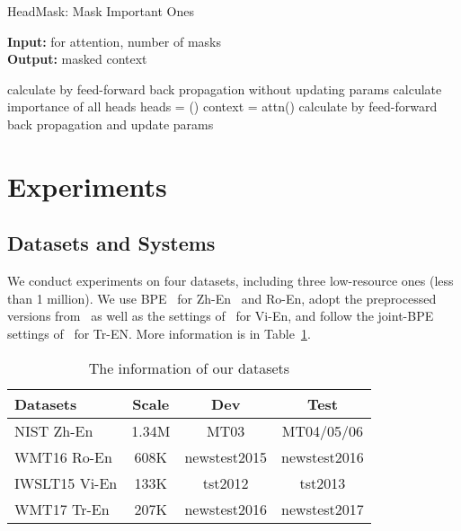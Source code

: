 \documentclass[11pt]{article}
\begin{document}
\begin{algorithm}[h]\footnotesize
    \caption{HeadMask: Mask Important Ones}
    \label{alg_importance}
    \begin{flushleft}
        \hspace*{0.02in} {\bf Input:}  for attention, number of masks \\
        \hspace*{0.02in} {\bf Output:} masked context
    \end{flushleft}
    \begin{algorithmic}[1]
            \STATE calculate  by feed-forward
            \STATE back propagation without updating params
            \STATE calculate importance of all heads 
            \STATE heads = ()
                \STATE 
            \ENDFOR
            \STATE context = attn()
            \STATE calculate  by feed-forward
            \STATE back propagation and update params
        \ENDFOR
  \end{algorithmic}
\end{algorithm}



\section{Experiments}

\subsection{Datasets and Systems}

We conduct experiments on four datasets, including three low-resource ones (less than 1 million). We use BPE~\cite{sennrich2016bpe} for Zh-En~\cite{Zheng2018LearningTD} and Ro-En, adopt the preprocessed versions from~ as well as the settings of~ for Vi-En, and follow the joint-BPE settings of~ for Tr-EN.
More information is in Table~\ref{tab_dataset}.





\begin{table}[h]\footnotesize
    \centering
    \begin{tabular}{lccc}
        \hline
        Datasets & Scale & Dev & Test \\ \hline
        NIST Zh-En & 1.34M & MT03 & MT04/05/06 \\ \hline
        WMT16 Ro-En & 608K & newstest2015 & newstest2016  \\ \hline
        IWSLT15 Vi-En & 133K & tst2012 & tst2013 \\ \hline
        WMT17 Tr-En & 207K & newstest2016 & newstest2017 \\ \hline
    \end{tabular}
    \caption{The information of our datasets}
    \label{tab_dataset}
\end{table}
\end{document}
